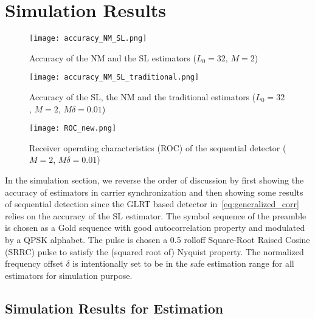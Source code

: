 \section{Simulation Results}%
\label{sec:simulations}

\begin{figure}[t]
    \centerline{\texttt{[image: accuracy\_NM\_SL.png]}}
    \caption{Accuracy of the NM and the SL estimators ($L_0=32$, $M=2$)}
    \label{fig:accuracy_NM_SL}
    \end{figure}

\begin{figure}[t]
    \centerline{\texttt{[image: accuracy\_NM\_SL\_traditional.png]}}
    \caption{Accuracy of the SL, the NM and the traditional estimators ($L_0=32$, $M=2$, $M\delta=0.01$)}
    \label{fig:accuracy_NM_SL_traditional}
    \end{figure}

\begin{figure}[t]
    \centerline{\texttt{[image: ROC\_new.png]}}
    \caption{Receiver operating characteristics (ROC) of the sequential detector ($M=2$, $M\delta=0.01$)}
    \label{fig:Receiver operating characteristics}
    \end{figure}

In the simulation section, we reverse the order of discussion by first showing 
the accuracy of estimators in carrier synchronization and then showing some results of sequential detection since
the GLRT based detector in~\eqref{eq:generalized_corr} relies on the accuracy of 
the SL estimator. The symbol sequence of the preamble is chosen as a Gold sequence 
with good autocorrelation property and
modulated by a QPSK alphabet.
The pulse is chosen a 0.5
rolloff Square-Root Raised Cosine (SRRC) pulse to satisfy the (squared root of) Nyquist property.
The normalized frequency offset $\delta$ is intentionally set to be in the safe estimation range for all estimators for simulation purpose.

\subsection{Simulation Results for Estimation}


